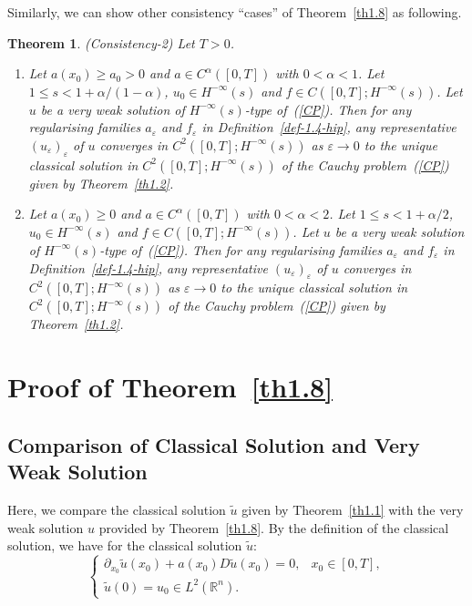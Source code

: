 \documentclass[12pt]{amsart}
\newtheorem{theorem}{Theorem}[section]
\theoremstyle{definition}
\begin{document}
Similarly, we can show other consistency ``cases'' of Theorem~\ref{th1.8} as following.

\begin{theorem}(Consistency-2)
\label{th1.9}
Let $T > 0$.
\begin{enumerate}
    \item[(i)] Let $a(x_0) \geq a_0 > 0$ and $a \in C^\alpha([0, T])$ with $0 < \alpha < 1$. Let $1 \leq s < 1 + \alpha/(1 - \alpha)$, $u_0 \in H^{-\infty}(s)$ and $f \in C([0, T]; H^{-\infty}(s))$. Let $u$ be a very weak solution of $H^{-\infty}(s)$-type of~(\ref{CP}). Then for any regularising families $a_\varepsilon$ and $f_\varepsilon$ in Definition~\ref{def-1.4-hip}, any representative $(u_\varepsilon)_\varepsilon$ of $u$ converges in $C^2([0, T]; H^{-\infty}(s))$ as $\varepsilon \to 0$ to the unique classical solution in $C^2([0, T]; H^{-\infty}(s))$ of the Cauchy problem~(\ref{CP}) given by Theorem~\ref{th1.2}.
    
    \item[(ii)] Let $a(x_0) \geq 0$ and $a \in C^\alpha([0, T])$ with $0 < \alpha < 2$. Let $1 \leq s < 1 + \alpha/2$, $u_0 \in H^{-\infty}(s)$ and $f \in C([0, T]; H^{-\infty}(s))$. Let $u$ be a very weak solution of $H^{-\infty}(s)$-type of~(\ref{CP}). Then for any regularising families $a_\varepsilon$ and $f_\varepsilon$ in Definition~\ref{def-1.4-hip}, any representative $(u_\varepsilon)_\varepsilon$ of $u$ converges in $C^2([0, T]; H^{-\infty}(s))$ as $\varepsilon \to 0$ to the unique classical solution in $C^2([0, T]; H^{-\infty}(s))$ of the Cauchy problem~(\ref{CP}) given by Theorem~\ref{th1.2}.
\end{enumerate}
\end{theorem}


\section*{Proof of Theorem~\ref{th1.8}}

\subsection*{Comparison of Classical Solution and Very Weak Solution}

Here, we compare the classical solution $\tilde{u}$ given by Theorem~\ref{th1.1} with the very weak solution $u$ provided by Theorem~\ref{th1.8}. By the definition of the classical solution, we have for the classical solution $\tilde{u}$:
\begin{equation}
\begin{cases}
\partial_{x_0} \tilde{u}(x_0) + a(x_0) D \tilde{u}(x_0) = 0, & x_0 \in [0, T], \\
\tilde{u}(0) = u_0 \in L^2(\mathbb{R}^n).
\end{cases}
\label{eq3.18}
\end{equation}
\end{document}
